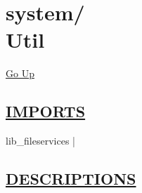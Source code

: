 \chapter*{\color{headfile}
{\large system\slash\hspace{0pt}}
 \\
Util
}
\hypertarget{ecldoc:toc:system.Util}{}
\hyperlink{ecldoc:toc:root/system}{Go Up}

\section*{\underline{\textsf{IMPORTS}}}
\begin{doublespace}
{\large
lib\_fileservices |
}
\end{doublespace}

\section*{\underline{\textsf{DESCRIPTIONS}}}
